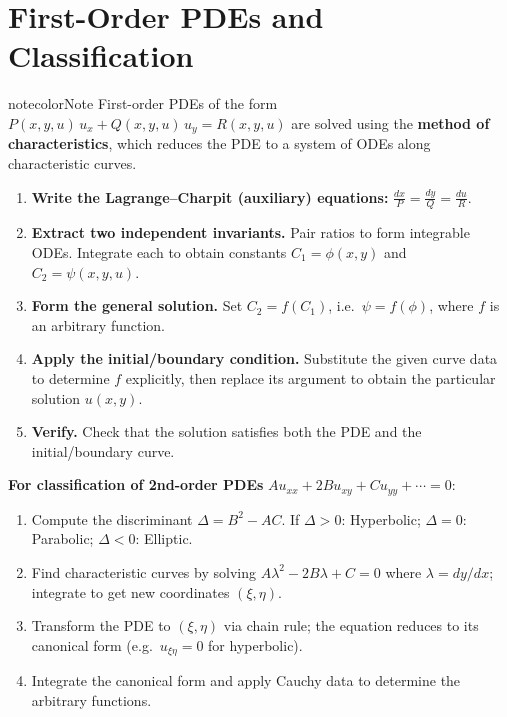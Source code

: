 \documentclass[a4paper,11pt]{article} %
\newenvironment{notebox}[1][]{\begin{custombox}[#1]{notecolor}{Note}}{\end{custombox}}
\begin{document}
\makeatletter
{}
\makeatother


\section{First-Order PDEs and Classification}

\begin{notebox}[title={General Procedure: Method of Characteristics}]
First-order PDEs of the form $P(x,y,u)\,u_x + Q(x,y,u)\,u_y = R(x,y,u)$ are solved using the \textbf{method of characteristics}, which reduces the PDE to a system of ODEs along characteristic curves.
\begin{enumerate}
    \item \textbf{Write the Lagrange--Charpit (auxiliary) equations:} $\displaystyle\frac{dx}{P} = \frac{dy}{Q} = \frac{du}{R}.$
    \item \textbf{Extract two independent invariants.} Pair ratios to form integrable ODEs. Integrate each to obtain constants $C_1 = \phi(x,y)$ and $C_2 = \psi(x,y,u)$.
    \item \textbf{Form the general solution.} Set $C_2 = f(C_1)$, i.e.\ $\psi = f(\phi)$, where $f$ is an arbitrary function.
    \item \textbf{Apply the initial/boundary condition.} Substitute the given curve data to determine $f$ explicitly, then replace its argument to obtain the particular solution $u(x,y)$.
    \item \textbf{Verify.} Check that the solution satisfies both the PDE and the initial/boundary curve.
\end{enumerate}
\textbf{For classification of 2nd-order PDEs} $Au_{xx}+2Bu_{xy}+Cu_{yy}+\cdots=0$:
\begin{enumerate}
    \item Compute the discriminant $\Delta = B^2-AC$. If $\Delta>0$: Hyperbolic; $\Delta=0$: Parabolic; $\Delta<0$: Elliptic.
    \item Find characteristic curves by solving $A\lambda^2 - 2B\lambda + C = 0$ where $\lambda = dy/dx$; integrate to get new coordinates $(\xi,\eta)$.
    \item Transform the PDE to $(\xi,\eta)$ via chain rule; the equation reduces to its canonical form (e.g.\ $u_{\xi\eta}=0$ for hyperbolic).
    \item Integrate the canonical form and apply Cauchy data to determine the arbitrary functions.
\end{enumerate}
\end{notebox}
\end{document}
